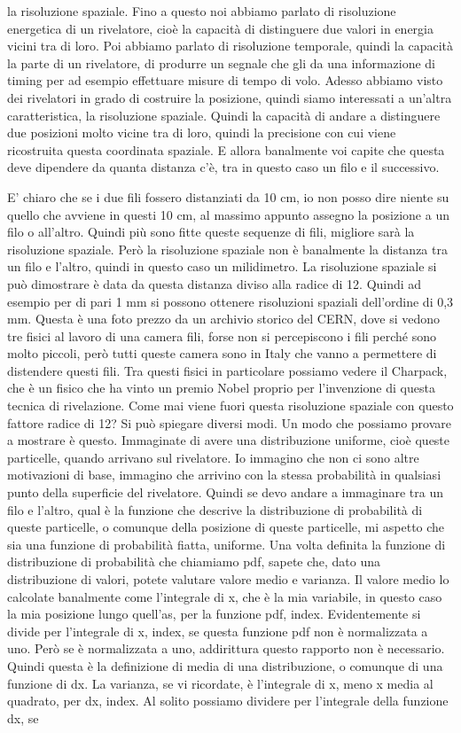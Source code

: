 la risoluzione spaziale. Fino a questo noi abbiamo parlato di risoluzione energetica di un rivelatore, cioè la capacità di distinguere due valori in energia vicini tra di loro. Poi abbiamo parlato di risoluzione temporale, quindi la capacità la parte di un rivelatore, di produrre un segnale che gli da una informazione di timing per ad esempio effettuare misure di tempo di volo. Adesso abbiamo visto dei rivelatori in grado di costruire la posizione, quindi siamo interessati a un'altra caratteristica, la risoluzione spaziale. Quindi la capacità di andare a distinguere due posizioni molto vicine tra di loro, quindi la precisione con cui viene ricostruita questa coordinata spaziale. E allora banalmente voi capite che questa deve dipendere da quanta distanza c'è, tra in questo caso un filo e il successivo. 

E' chiaro che se i due fili fossero distanziati da 10 cm, io non posso dire niente su quello che avviene in questi 10 cm, al massimo appunto assegno la posizione a un filo o all'altro. Quindi più sono fitte queste sequenze di fili, migliore sarà la risoluzione spaziale. Però la risoluzione spaziale non è banalmente la distanza tra un filo e l'altro, quindi in questo caso un milidimetro. La risoluzione spaziale si può dimostrare è data da questa distanza diviso alla radice di 12. Quindi ad esempio per di pari 1 mm si possono ottenere risoluzioni spaziali dell'ordine di 0,3 mm. Questa è una foto prezzo da un archivio storico del CERN, dove si vedono tre fisici al lavoro di una camera fili, forse non si percepiscono i fili perché sono molto piccoli, però tutti queste camera sono in Italy che vanno a permettere di distendere questi fili. Tra questi fisici in particolare possiamo vedere il Charpack, che è un fisico che ha vinto un premio Nobel proprio per l'invenzione di questa tecnica di rivelazione. Come mai viene fuori questa risoluzione spaziale con questo fattore radice di 12? Si può spiegare diversi modi. Un modo che possiamo provare a mostrare è questo. Immaginate di avere una distribuzione uniforme, cioè queste particelle, quando arrivano sul rivelatore. Io immagino che non ci sono altre motivazioni di base, immagino che arrivino con la stessa probabilità in qualsiasi punto della superficie del rivelatore. Quindi se devo andare a immaginare tra un filo e l'altro, qual è la funzione che descrive la distribuzione di probabilità di queste particelle, o comunque della posizione di queste particelle, mi aspetto che sia una funzione di probabilità fiatta, uniforme. Una volta definita la funzione di distribuzione di probabilità che chiamiamo pdf, sapete che, dato una distribuzione di valori, potete valutare valore medio e varianza. Il valore medio lo calcolate banalmente come l'integrale di x, che è la mia variabile, in questo caso la mia posizione lungo quell'as, per la funzione pdf, index. Evidentemente si divide per l'integrale di x, index, se questa funzione pdf non è normalizzata a uno. Però se è normalizzata a uno, addirittura questo rapporto non è necessario. Quindi questa è la definizione di media di una distribuzione, o comunque di una funzione di dx. La varianza, se vi ricordate, è l'integrale di x, meno x media al quadrato, per dx, index. Al solito possiamo dividere per l'integrale della funzione dx, se 